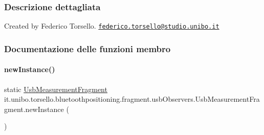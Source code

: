 \subsubsection{Descrizione dettagliata}
Created by Federico Torsello. \href{mailto:federico.torsello@studio.unibo.it}{\tt federico.\+torsello@studio.\+unibo.\+it} 

\subsubsection{Documentazione delle funzioni membro}
\hypertarget{classit_1_1unibo_1_1torsello_1_1bluetoothpositioning_1_1fragment_1_1usbObservers_1_1UsbMeasurementFragment_a89f816d627cf4902d2886de7cd222f81_a89f816d627cf4902d2886de7cd222f81}{}\label{classit_1_1unibo_1_1torsello_1_1bluetoothpositioning_1_1fragment_1_1usbObservers_1_1UsbMeasurementFragment_a89f816d627cf4902d2886de7cd222f81_a89f816d627cf4902d2886de7cd222f81} 
\paragraph{\texorpdfstring{new\+Instance()}{newInstance()}}
{\footnotesize\ttfamily static \hyperlink{classit_1_1unibo_1_1torsello_1_1bluetoothpositioning_1_1fragment_1_1usbObservers_1_1UsbMeasurementFragment}{Usb\+Measurement\+Fragment} it.\+unibo.\+torsello.\+bluetoothpositioning.\+fragment.\+usb\+Observers.\+Usb\+Measurement\+Fragment.\+new\+Instance (\begin{DoxyParamCaption}{ }\end{DoxyParamCaption})\hspace{0.3cm}{\ttfamily [static]}}



